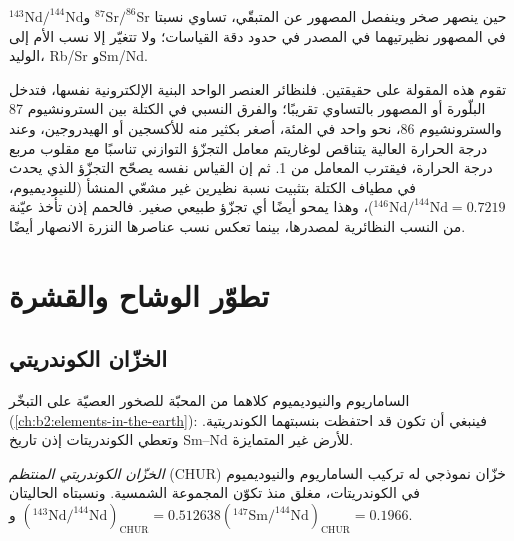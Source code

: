 \begin{proposition}\label{prop:b2:isotope-geochemistry:melting}
حين ينصهر صخر وينفصل المصهور عن المتبقّي، تساوي نسبتا
$^{87}\mathrm{Sr}/^{86}\mathrm{Sr}$ و$^{143}\mathrm{Nd}/^{144}\mathrm{Nd}$ في
المصهور نظيرتيهما في المصدر في حدود دقة
القياسات؛ ولا تتغيّر إلا نسب الأم إلى الوليد، Rb/Sr وSm/Nd.
\end{proposition}
\admitted

\noindent تقوم هذه المقولة على حقيقتين. فلنظائر العنصر الواحد البنية
الإلكترونية نفسها، فتدخل البلّورة أو المصهور بالتساوي تقريبًا؛ والفرق
النسبي في الكتلة بين السترونشيوم 87 والسترونشيوم 86، نحو واحد في
المئة، أصغر بكثير منه للأكسجين أو الهيدروجين، وعند درجة الحرارة العالية يتناقص
لوغاريتم معامل التجزّؤ التوازني تناسبًا مع مقلوب مربع
درجة الحرارة، فيقترب المعامل من 1. ثم إن القياس نفسه يصحّح
التجزّؤ الذي يحدث في مطياف الكتلة بتثبيت نسبة نظيرين
غير مشعّي المنشأ (للنيوديميوم، $^{146}\mathrm{Nd}/^{144}\mathrm{Nd} =
0.7219$)، وهذا يمحو أيضًا أي تجزّؤ طبيعي صغير. فالحمم إذن
تأخذ عيّنة من النسب النظائرية لمصدرها، بينما تعكس نسب عناصرها
النزرة الانصهار أيضًا.

\section{تطوّر الوشاح والقشرة}

\subsection{الخزّان الكوندريتي}

الساماريوم والنيوديميوم كلاهما من  المحبّة للصخور العصيّة على التبخّر
(\cref{ch:b2:elements-in-the-earth}): فينبغي أن تكون  قد احتفظت
بنسبتهما الكوندريتية. وتعطي الكوندريتات إذن تاريخ Sm--Nd للأرض
غير المتمايزة.

\begin{definition}\label{def:b2:isotope-geochemistry:chur}
\emph{الخزّان الكوندريتي المنتظم}
(CHUR) خزّان نموذجي له تركيب الساماريوم والنيوديميوم في
الكوندريتات، مغلق منذ تكوّن المجموعة الشمسية. ونسبتاه
الحاليتان $(^{143}\mathrm{Nd}/^{144}\mathrm{Nd})_{\mathrm{CHUR}} = 0.512638$
و$(^{147}\mathrm{Sm}/^{144}\mathrm{Nd})_{\mathrm{CHUR}} = 0.1966$.
\end{definition}

